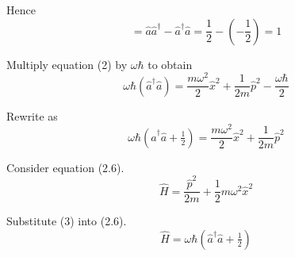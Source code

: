 Hence
\begin{equation*}
[\hat a,\hat a^\dag]=\hat a\hat a^\dag-\hat a^\dag\hat a=\frac{1}{2}-\left(-\frac{1}{2}\right)=1
\end{equation*}

Multiply equation (2) by $\omega\hbar$ to obtain
\begin{equation*}
\omega\hbar\left(\hat a^\dag\hat a\right)=\frac{m\omega^2}{2}\hat x^2+\frac{1}{2m}\hat p^2-\frac{\omega\hbar}{2}
\end{equation*}

Rewrite as
\begin{equation*}
\omega\hbar\left(\hat a^\dag\hat a+\tfrac{1}{2}\right)
=\frac{m\omega^2}{2}\hat x^2+\frac{1}{2m}\hat p^2
\tag{3}
\end{equation*}

Consider equation (2.6).
\begin{equation*}
\hat H=\frac{\hat p^2}{2m}+\frac{1}{2}m\omega^2\hat x^2
\tag{2.6}
\end{equation*}

Substitute (3) into (2.6).
\begin{equation*}
\hat H=\omega\hbar\left(\hat a^\dag\hat a+\tfrac{1}{2}\right)
\end{equation*}


